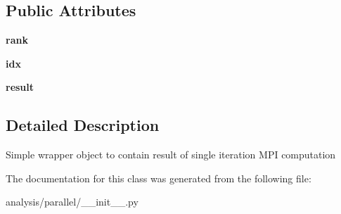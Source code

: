 \subsection*{Public Attributes}
\begin{DoxyCompactItemize}
\item 
\hypertarget{classseren3_1_1analysis_1_1parallel_1_1Result_a3c974b07359552e0239e4fe10369248f}{
{\bfseries rank}}
\label{classseren3_1_1analysis_1_1parallel_1_1Result_a3c974b07359552e0239e4fe10369248f}

\item 
\hypertarget{classseren3_1_1analysis_1_1parallel_1_1Result_a9310810b011d2b934ec720a7172425ae}{
{\bfseries idx}}
\label{classseren3_1_1analysis_1_1parallel_1_1Result_a9310810b011d2b934ec720a7172425ae}

\item 
\hypertarget{classseren3_1_1analysis_1_1parallel_1_1Result_a1a847949fd8b917237b3e085a7ab64eb}{
{\bfseries result}}
\label{classseren3_1_1analysis_1_1parallel_1_1Result_a1a847949fd8b917237b3e085a7ab64eb}

\end{DoxyCompactItemize}


\subsection{Detailed Description}
\begin{DoxyVerb}
Simple wrapper object to contain result of single iteration MPI computation
\end{DoxyVerb}
 

The documentation for this class was generated from the following file:\begin{DoxyCompactItemize}
\item 
analysis/parallel/\_\-\_\-init\_\-\_\-.py\end{DoxyCompactItemize}
